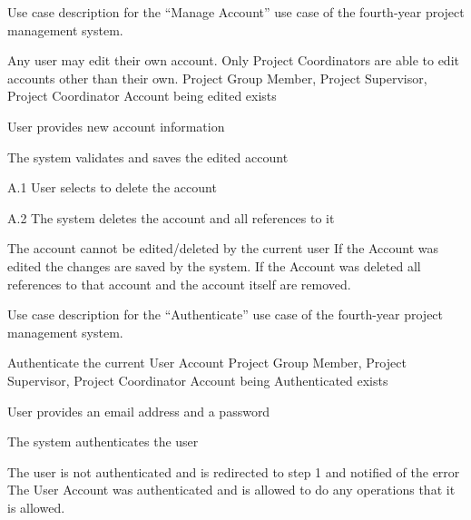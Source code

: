 \documentclass[document.tex]{subfiles}
\begin{document}
\begin{table}
  \centering
  \caption{Use case description for the ``Manage Account'' use case of the fourth-year project management system.}
  \label{tbl:use-case-manage-account}

  \begin{usecase}
    Any user may edit their own account. Only Project Coordinators are able to edit accounts other than their own.
    Project Group Member, Project Supervisor, Project Coordinator
    Account being edited exists
    \ucnormal
    \begin{ucenum}
      \item User provides new account information
      \item The system validates and saves the edited account
    \end{ucenum}
    \begin{ucenum}
      \item [A.1] User selects to delete the account
      \item [A.2] The system deletes the account and all references to it
    \end{ucenum}
    The account cannot be edited\slash deleted by the current user
    If the Account was edited the changes are saved by the system. If the Account was deleted all references to that account and the account itself are removed.
  \end{usecase}
\end{table}


\begin{table}
  \centering
  \caption{Use case description for the ``Authenticate'' use case of the fourth-year project management system.}
  \label{tbl:use-case-authenticate}

  \begin{usecase}[Authenticate]
    Authenticate the current User Account
    Project Group Member, Project Supervisor, Project Coordinator
    Account being Authenticated exists
    \ucnormal
    \begin{ucenum}
      \item User provides an email address and a password
      \item The system authenticates the user
    \end{ucenum}
    The user is not authenticated and is redirected to step 1 and notified of the error
    The User Account was authenticated and is allowed to do any operations that it is allowed.
  \end{usecase}
\end{table}
\end{document}
